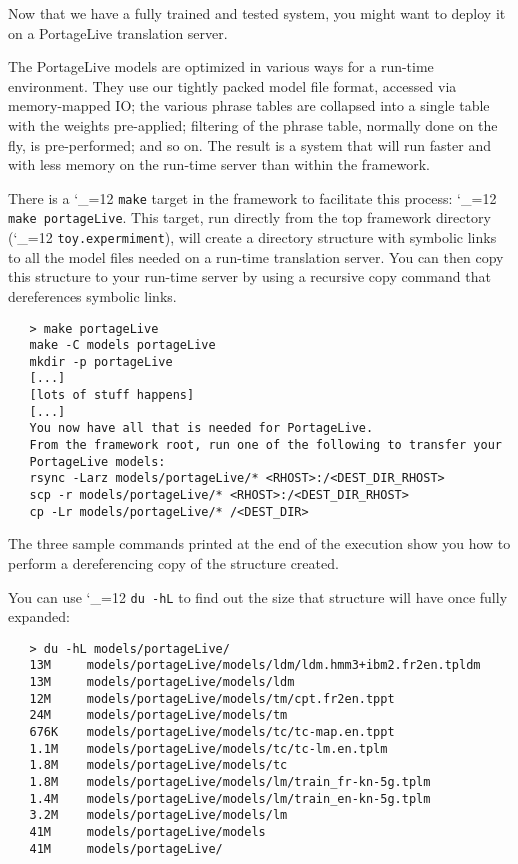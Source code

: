 \documentclass[11pt,letterpaper]{article}
\def\code{\begingroup\catcode`\_=12 \codex}
\newcommand{\codex}[1]{\texttt{#1}\endgroup}
\begin{document}
Now that we have a fully trained and tested system, you might want to deploy it
on a PortageLive translation server.  

The PortageLive models are optimized in various ways for a run-time
environment.  They use our tightly packed model file format, accessed
via memory-mapped IO; the various phrase tables are collapsed into a single
table with the weights pre-applied; filtering of the phrase table, normally
done on the fly, is pre-performed; and so on.  The result is a system that will
run faster and with less memory on the run-time server than within the
framework.

There is a \code{make} target in the framework to facilitate this process:
\code{make portageLive}.  This target, run directly from the top framework
directory (\code{toy.expermiment}), will create a directory structure with
symbolic links to all the model files needed on a run-time translation  server. 
You can then copy this structure to your run-time server by using a recursive
copy command that dereferences symbolic links.

\begin{small}
\begin{verbatim}
   > make portageLive
   make -C models portageLive
   mkdir -p portageLive
   [...]
   [lots of stuff happens]
   [...]
   You now have all that is needed for PortageLive.
   From the framework root, run one of the following to transfer your 
   PortageLive models: 
   rsync -Larz models/portageLive/* <RHOST>:/<DEST_DIR_RHOST>
   scp -r models/portageLive/* <RHOST>:/<DEST_DIR_RHOST>
   cp -Lr models/portageLive/* /<DEST_DIR>
\end{verbatim}
\end{small}

The three sample commands printed at the end of the execution show you how to
perform a dereferencing copy of the structure created.

You can use \code{du -hL} to find out the size that structure will have once
fully expanded:
\begin{small}
\begin{verbatim}
   > du -hL models/portageLive/
   13M     models/portageLive/models/ldm/ldm.hmm3+ibm2.fr2en.tpldm
   13M     models/portageLive/models/ldm
   12M     models/portageLive/models/tm/cpt.fr2en.tppt
   24M     models/portageLive/models/tm
   676K    models/portageLive/models/tc/tc-map.en.tppt
   1.1M    models/portageLive/models/tc/tc-lm.en.tplm
   1.8M    models/portageLive/models/tc
   1.8M    models/portageLive/models/lm/train_fr-kn-5g.tplm
   1.4M    models/portageLive/models/lm/train_en-kn-5g.tplm
   3.2M    models/portageLive/models/lm
   41M     models/portageLive/models
   41M     models/portageLive/
   
\end{verbatim}
\end{small}
\end{document}
